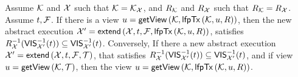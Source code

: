 \begin{theorem}
    \label{thm:view-vis-relation}
    Assume \( \mathcal{K} \) and \( \mathcal{X} \) such that \( \mathcal{K} = \mathcal{K}_{\mathcal{X}} \), 
    and \( R_{\mathcal{K}} \) and \( R_{\mathcal{X}} \) such that \( R_{\mathcal{K}} = R_{\mathcal{X}} \).
    Assume \(t, \mathcal{F} \).
    If there is a view \( \vi = \getView[\mkvs,\lfpTx[\mkvs,\vi,\rel]] \),
    then the new abstract execution \( \aexec' = \extend[\aexec, \txid, \fp, \lfpTx[\mkvs,\vi,\rel]] \),
    satisfies \( R_{\mathcal{X}}^{-1}(\mathsf{VIS}_{\mathcal{X}'}^{-1}(t)) \subseteq \mathsf{VIS}_{\mathcal{X}'}^{-1}(t) \).
    Conversely,
    If there a new abstract execution \( \aexec' = \extend[\aexec, \txid, \fp, \txidset] \),
    that satisfies \( R_{\mathcal{X}}^{-1}(\mathsf{VIS}_{\mathcal{X}'}^{-1}(t)) \subseteq \mathsf{VIS}_{\mathcal{X}'}^{-1}(t) \),
    and if view \( \vi = \getView[\mkvs,\txidset] \),
    then the view \( \vi = \getView[\mkvs,\lfpTx[\mkvs,\vi,\rel]] \).
\end{theorem}
